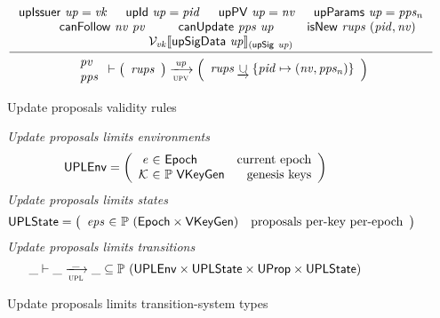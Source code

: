 \begin{figure}[htb]
  \begin{equation}
    \label{eq:rule:up-validity}
    \inference
    {
      \upIssuer{up} = \var{vk}
      & \upId{up} = \var{pid}
      & \upPV{up} = \var{nv}
      & \upParams{up} = \var{pps_n}\\
      & \fun{canFollow}~\var{nv}~\var{pv}
      & \fun{canUpdate}~\var{pps}~\var{up}
      & \fun{isNew}~\var{rups}~(\var{pid}, \var{nv})\\
      \mathcal{V}_{\var{vk}}\serialised{\upSigData{up}}_{(\upSig{up})}
    }
    {
      {
        \begin{array}{l}
          \var{pv}\\
          \var{pps}
        \end{array}
      }
      \vdash
      {
        \left(
          \begin{array}{l}
            \var{rups}
          \end{array}
        \right)
      }
      \trans{upv}{\var{up}}
      {
        \left(
          \begin{array}{l}
            \var{rups} \unionoverride \{ \var{pid} \mapsto (\var{nv}, \var{pps_n}) \}
          \end{array}
        \right)
      }
    }
  \end{equation}
  \caption{Update proposals validity rules}
  \label{fig:rules:up-validity}
\end{figure}

\clearpage

\begin{figure}[htb]
  \emph{Update proposals limits  environments}
    \begin{equation*}
    \UPLEnv =
    \left(
      \begin{array}{r@{~\in~}lr}
        \var{e} & \Epoch & \text{current epoch}\\
        \mathcal{K} & \powerset{\VKeyGen} & \text{genesis keys}\\
      \end{array}
    \right)
  \end{equation*}
  \emph{Update proposals limits states}
  \begin{equation*}
    \UPLState
    = \left(
      \begin{array}{r@{~\in~}lr}
        \var{eps} & \powerset{(\Epoch \times \VKeyGen)} & \text{proposals per-key per-epoch}\\
      \end{array}
    \right)
  \end{equation*}
  \emph{Update proposals limits transitions}
  \begin{equation*}
    \var{\_} \vdash
    \var{\_} \trans{upl}{\_} \var{\_}
    \subseteq \powerset (\UPLEnv \times \UPLState \times \UProp \times \UPLState)
  \end{equation*}
  \caption{Update proposals limits transition-system types}
  \label{fig:ts-types:up-limits}
\end{figure}

